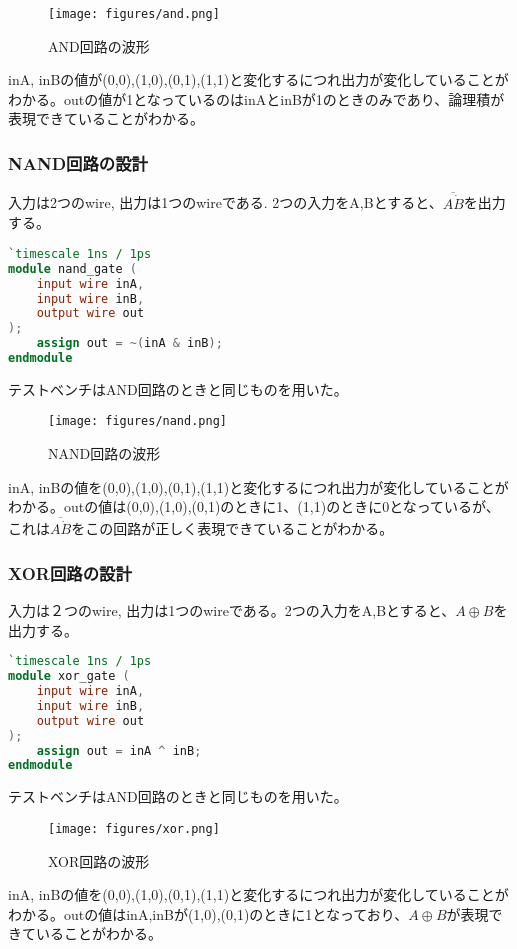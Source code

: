 \documentclass[titlepage]{ltjsarticle}
\begin{document}
\begin{figure}[H]
    \begin{center}
        \texttt{[image: figures/and.png]}
        \caption{AND回路の波形}
    \end{center}
\end{figure}
inA, inBの値が(0,0),(1,0),(0,1),(1,1)と変化するにつれ出力が変化していることがわかる。outの値が1となっているのはinAとinBが1のときのみであり、論理積が表現できていることがわかる。

\subsubsection{NAND回路の設計}
入力は2つのwire, 出力は1つのwireである. 2つの入力をA,Bとすると、$\overline{A\dot B}$を出力する。

\begin{lstlisting}[caption=NANDデザイン,language=verilog]
`timescale 1ns / 1ps
module nand_gate (
    input wire inA,
    input wire inB,
    output wire out
);
    assign out = ~(inA & inB);
endmodule
\end{lstlisting}
テストベンチはAND回路のときと同じものを用いた。

\begin{figure}[H]
    \begin{center}
        \texttt{[image: figures/nand.png]}
        \caption{NAND回路の波形}
    \end{center}
\end{figure}
inA, inBの値を(0,0),(1,0),(0,1),(1,1)と変化するにつれ出力が変化していることがわかる。outの値は(0,0),(1,0),(0,1)のときに1、(1,1)のときに0となっているが、これは$\overline{A\dot B}$をこの回路が正しく表現できていることがわかる。

\subsubsection{XOR回路の設計}
入力は２つのwire, 出力は1つのwireである。2つの入力をA,Bとすると、$A \oplus B$を出力する。
\begin{lstlisting}[caption=XORデザイン, language=verilog]
`timescale 1ns / 1ps
module xor_gate (
    input wire inA,
    input wire inB,
    output wire out
);
    assign out = inA ^ inB;
endmodule
\end{lstlisting}
テストベンチはAND回路のときと同じものを用いた。
\begin{figure}[H]
    \begin{center}
        \texttt{[image: figures/xor.png]}
        \caption{XOR回路の波形}
    \end{center}
\end{figure}
inA, inBの値を(0,0),(1,0),(0,1),(1,1)と変化するにつれ出力が変化していることがわかる。outの値はinA,inBが(1,0),(0,1)のときに1となっており、$A \oplus B$が表現できていることがわかる。
\end{document}
